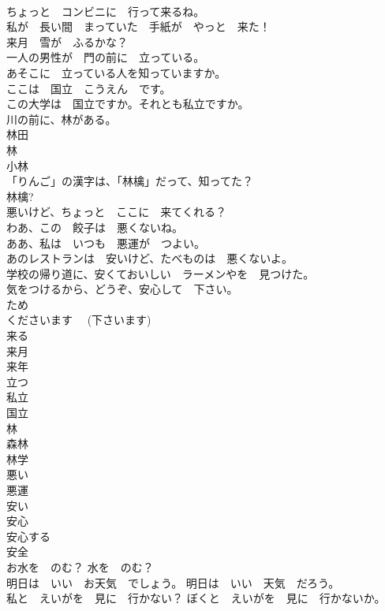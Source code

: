 \documentclass[8pt]{extreport}
\begin{document}
\begin{CJK}{UTF8}{min}
\\	ちょっと　コンビニに　行って来るね。	
\\	私が　長い間　まっていた　手紙が　やっと　来た！	
\\	来月　雪が　ふるかな？	
\\	一人の男性が　門の前に　立っている。	
\\	あそこに　立っている人を知っていますか。	
\\	ここは　国立　こうえん　です。	
\\	この大学は　国立ですか。それとも私立ですか。	
\\	川の前に、林がある。	
\\	林田	
\\	林	
\\	小林	
\\	「りんご」の漢字は、「林檎」だって、知ってた？	
\\	林檎?	
\\	悪いけど、ちょっと　ここに　来てくれる？	
\\	わあ、この　餃子は　悪くないね。	
\\	ああ、私は　いつも　悪運が　つよい。	
\\	あのレストランは　安いけど、たべものは　悪くないよ。	
\\	学校の帰り道に、安くておいしい　ラーメンやを　見つけた。	
\\	気をつけるから、どうぞ、安心して　下さい。	
\\	ため	
\\	くださいます　 (下さいます)	
\\	来る	
\\	来月	
\\	来年	
\\	立つ	
\\	私立	
\\	国立	
\\	林	
\\	森林	
\\	林学	
\\	悪い	
\\	悪運	
\\	安い	
\\	安心	
\\	安心する	
\\	安全	
\\	お水を　のむ？ 水を　のむ？	
\\	明日は　いい　お天気　でしょう。 明日は　いい　天気　だろう。	
\\	私と　えいがを　見に　行かない？ ぼくと　えいがを　見に　行かないか。	

\end{CJK}
\end{document}

